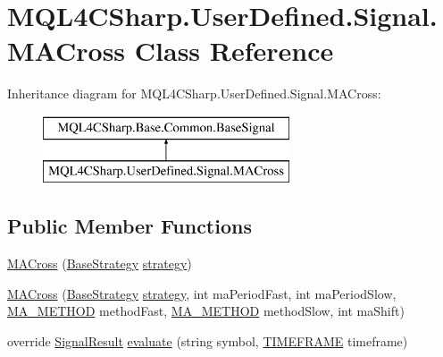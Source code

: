\hypertarget{class_m_q_l4_c_sharp_1_1_user_defined_1_1_signal_1_1_m_a_cross}{}\section{M\+Q\+L4\+C\+Sharp.\+User\+Defined.\+Signal.\+M\+A\+Cross Class Reference}
\label{class_m_q_l4_c_sharp_1_1_user_defined_1_1_signal_1_1_m_a_cross}
Inheritance diagram for M\+Q\+L4\+C\+Sharp.\+User\+Defined.\+Signal.\+M\+A\+Cross\+:\begin{figure}[H]
\begin{center}
\leavevmode
\includegraphics[height=2.000000cm]{class_m_q_l4_c_sharp_1_1_user_defined_1_1_signal_1_1_m_a_cross}
\end{center}
\end{figure}
\subsection*{Public Member Functions}
\begin{DoxyCompactItemize}
\item 
\hyperlink{class_m_q_l4_c_sharp_1_1_user_defined_1_1_signal_1_1_m_a_cross_ae85905b59de36871635cdc86533d8ab0}{M\+A\+Cross} (\hyperlink{class_m_q_l4_c_sharp_1_1_base_1_1_base_strategy}{Base\+Strategy} \hyperlink{class_m_q_l4_c_sharp_1_1_base_1_1_common_1_1_base_signal_adc5fd0efe0218a05bd5b0fb84c0d3814}{strategy})
\item 
\hyperlink{class_m_q_l4_c_sharp_1_1_user_defined_1_1_signal_1_1_m_a_cross_a02acd3123db6463a905369c19ef766ef}{M\+A\+Cross} (\hyperlink{class_m_q_l4_c_sharp_1_1_base_1_1_base_strategy}{Base\+Strategy} \hyperlink{class_m_q_l4_c_sharp_1_1_base_1_1_common_1_1_base_signal_adc5fd0efe0218a05bd5b0fb84c0d3814}{strategy}, int ma\+Period\+Fast, int ma\+Period\+Slow, \hyperlink{namespace_m_q_l4_c_sharp_1_1_base_1_1_enums_a08834770d91baf0ef62cf476822cf9a4}{M\+A\+\_\+\+M\+E\+T\+H\+OD} method\+Fast, \hyperlink{namespace_m_q_l4_c_sharp_1_1_base_1_1_enums_a08834770d91baf0ef62cf476822cf9a4}{M\+A\+\_\+\+M\+E\+T\+H\+OD} method\+Slow, int ma\+Shift)
\item 
override \hyperlink{class_m_q_l4_c_sharp_1_1_base_1_1_common_1_1_signal_result}{Signal\+Result} \hyperlink{class_m_q_l4_c_sharp_1_1_user_defined_1_1_signal_1_1_m_a_cross_ac2412b74019f021a2c636d030237614e}{evaluate} (string symbol, \hyperlink{namespace_m_q_l4_c_sharp_1_1_base_1_1_enums_a838810aaa87c63c12737408dba8c0b35}{T\+I\+M\+E\+F\+R\+A\+ME} timeframe)
\end{DoxyCompactItemize}
